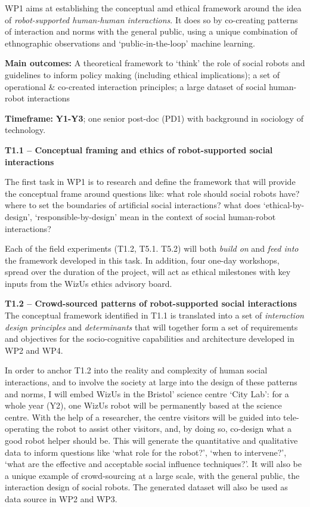\documentclass[11pt,a4paper]{report}
\newcommand{\project}{WizUs\xspace}
\begin{document}
WP1 aims at establishing the conceptual amd ethical framework around the idea of
\emph{robot-supported human-human interactions}. It does so by co-creating
patterns of interaction and norms with the general public, using a unique
combination of ethnographic observations and `public-in-the-loop' machine
learning.

\begin{framed}
    \textbf{Main outcomes:} A theoretical framework to `think' the role of
    social robots and guidelines to inform policy making (including ethical
    implications); a set of operational \& co-created interaction principles; a
    large dataset of social human-robot interactions

    \textbf{Timeframe:} \textbf{Y1-Y3}; one senior post-doc (PD1)
with background in sociology of technology.
\end{framed}


\textbf{T1.1 -- Conceptual framing and ethics of robot-supported social
interactions}


The first task in WP1 is to research and define the framework that will provide
the conceptual frame around questions like: what role should social robots have? where
to set the boundaries of artificial social interactions?  what does
`ethical-by-design', `responsible-by-design' mean in the context of social
human-robot interactions? 

Each of the field experiments (T1.2, T5.1. T5.2) will both \emph{build on} and
\emph{feed into} the framework developed in this task. In addition, four
one-day workshops, spread over the
duration of the project, will act as ethical milestones with key inputs from the
\project ethics advisory board.

\textbf{T1.2 -- Crowd-sourced patterns of robot-supported social
interactions} The conceptual framework identified in T1.1 is translated
into a set of \emph{interaction design principles} and \emph{determinants} that
will together form a set of requirements and objectives for the socio-cognitive
capabilities and architecture developed in WP2 and WP4.

In order to anchor T1.2 into the reality and complexity of human social
interactions, and to involve the society at large into the design of these
patterns and norms, I will embed \project in the Bristol' science centre `City
Lab': for a whole year (Y2), one \project robot will be permanently based at the
science centre. With the help of a researcher, the centre visitors will be guided into
tele-operating the robot to assist other visitors, and, by doing so, co-design
what a good robot helper should be. This will generate the quantitative and
qualitative data to inform questions like `what role for the robot?', `when to
intervene?', `what are the effective and acceptable social influence
techniques?'. It will also be a unique example of crowd-sourcing at a large
scale, with the general public, the interaction design of social robots.  The
generated dataset will also be used as data source in WP2 and WP3.
\end{document}
